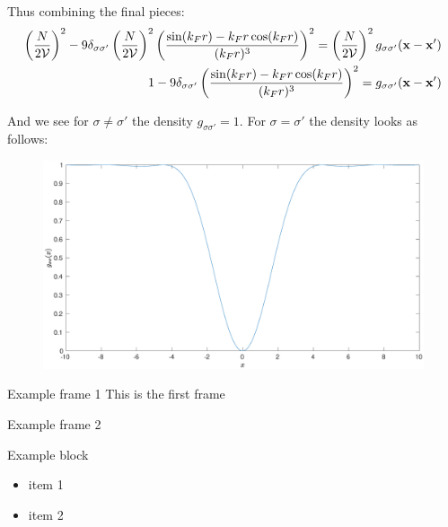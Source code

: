 \documentclass{beamer}
\begin{document}
\begin{frame}
Thus combining the final pieces: 
\begin{align*}
\left(\frac{N}{2\mathcal{V}}\right)^2 -9\delta_{\sigma\sigma'}\left(\frac{N}{2\mathcal{V}}\right)^2 \left( \frac{\sin(k_Fr) - k_Fr \cos(k_Fr)}{(k_Fr)^3}\right)^2 = \left(\frac{N}{2\mathcal{V}}\right)^2 g_{\sigma\sigma'}(\textbf{x}-\textbf{x}') \\
1 -9\delta_{\sigma\sigma'} \left( \frac{\sin(k_Fr) - k_Fr \cos(k_Fr)}{(k_Fr)^3}\right)^2 =  g_{\sigma\sigma'}(\textbf{x}-\textbf{x}')
\end{align*}

And we see for $\sigma \neq \sigma'$ the density $g_{\sigma\sigma'}=1$.
For $\sigma = \sigma'$ the density looks as follows:

\begin{figure}[H]
\centering
\includegraphics[width=\textwidth]{Density}
\end{figure}
\end{frame}

\begin{frame}{Example frame 1}
This is the first frame
\end{frame}

\begin{frame}{Example frame 2}
\begin{block}{Example block}
\begin{itemize}
\item item 1
\item item 2
\end{itemize}
\end{block}
\end{frame}
\end{document}

